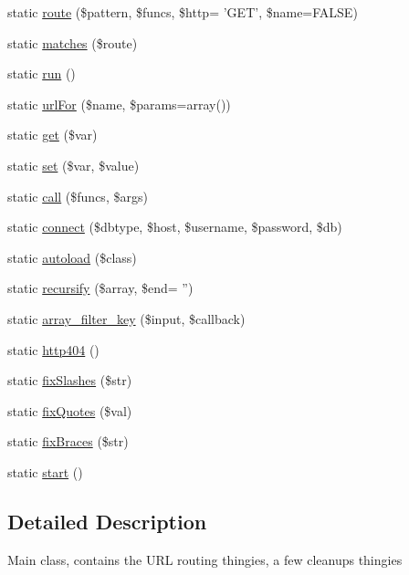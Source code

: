 \begin{DoxyCompactItemize}
\item 
static \hyperlink{classrolisz_aafd29366ef6399da1dd079fc131d8858}{route} (\$pattern, \$funcs, \$http= 'GET', \$name=FALSE)
\item 
static \hyperlink{classrolisz_a78ab5fc58d307458ac8767f50178fc7a}{matches} (\$route)
\item 
static \hyperlink{classrolisz_ad3a572002fd350672b531756f7306e8f}{run} ()
\item 
static \hyperlink{classrolisz_a2c24b81993e81c6401edd6c4caff0336}{urlFor} (\$name, \$params=array())
\item 
static \hyperlink{classrolisz_a0e8f3e2708d9f0c6ee7b54599f57ea34}{get} (\$var)
\item 
static \hyperlink{classrolisz_a1d7c8d5e3d237bc3217650f79ab35bd3}{set} (\$var, \$value)
\item 
static \hyperlink{classrolisz_af732c33c326c863efe6dd2cccb21a9a5}{call} (\$funcs, \$args)
\item 
static \hyperlink{classrolisz_a7cee6d5c562bcb595bc9d826910d248d}{connect} (\$dbtype, \$host, \$username, \$password, \$db)
\item 
static \hyperlink{classrolisz_ab4c022bf9d3474583030f31894865182}{autoload} (\$class)
\item 
static \hyperlink{classrolisz_ad1b6efe27562cb6620a179f5688417bb}{recursify} (\$array, \$end= '')
\item 
static \hyperlink{classrolisz_a4e3140efc0d16bf5a55ee6c2f3c129e2}{array\_\-filter\_\-key} (\$input, \$callback)
\item 
static \hyperlink{classrolisz_a6fdc4c9fc517c619d860c7e91d17b02d}{http404} ()
\item 
static \hyperlink{classrolisz_a13d0c0500b75a5bdd849a4a55ba8e2b1}{fixSlashes} (\$str)
\item 
static \hyperlink{classrolisz_a031dd360aea86d999059dbfd18687973}{fixQuotes} (\$val)
\item 
static \hyperlink{classrolisz_ab8e0e9e5ffd59108f38efefe79511c5b}{fixBraces} (\$str)
\item 
static \hyperlink{classrolisz_a146085d0f3a9d17bdcd7f3d4081d8c0d}{start} ()
\end{DoxyCompactItemize}


\subsection{Detailed Description}
Main class, contains the URL routing thingies, a few cleanups thingies 

